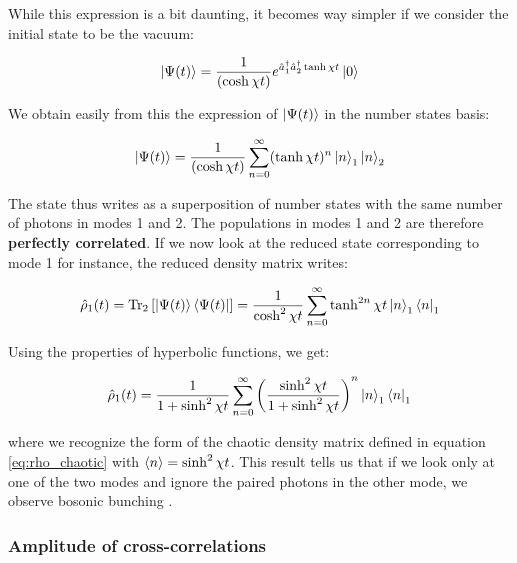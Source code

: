 \noindent While this expression is a bit daunting, it becomes way simpler if we consider the initial state to be the vacuum:

\begin{equation}
    \ket{\Psi(t)} = \frac{1}{(\cosh \chi t)} e^{\hat{a}_{1}^{\dagger} \hat{a}_{2}^{\dagger} \tanh \chi t} \ket{0}
\end{equation}

\noindent We obtain easily from this the expression of $\ket{\Psi(t)}$ in the number states basis:

\begin{equation}
    |\Psi(t)\rangle=\frac{1}{(\cosh \chi t)} \sum_{n=0}^{\infty}(\tanh \chi t)^{n} \ket{n}_1 \ket{n}_2
\end{equation}

\label{sec:correlated_pop}

\noindent The state thus writes as a superposition of number states with the same number of photons in modes 1 and 2. The populations in modes 1 and 2 are therefore \textbf{perfectly correlated}. If we now look at the reduced state corresponding to mode 1 for instance, the reduced density matrix writes:

\begin{equation}
    \hat{\rho}_1 (t) = \mathrm{Tr}_2 \left[ \ket{\Psi(t)} \bra{\Psi(t)} \right] = \frac{1}{\cosh^2 \chi t} \sum_{n=0}^{\infty}\tanh^{2n} \chi t \ket{n}_1 \bra{n}_1
\end{equation}

\noindent Using the properties of hyperbolic functions, we get:

\begin{equation}
 \hat{\rho}_1 (t) = \frac{1}{1+ \sinh^2 \chi t} \sum_{n=0}^{\infty} \left( \frac{\sinh^2 \chi t}{1+\sinh^2 \chi t} \right)^n \ket{n}_1 \bra{n}_1
\end{equation}

\noindent where we recognize the form of the chaotic density matrix defined in equation \ref{eq:rho_chaotic} with $\langle n\rangle = \sinh^2 \chi t$. This result tells us that if we look only at one of the two modes and ignore the paired photons in the other mode, we observe bosonic bunching \cite{yurke1987} .


\subsubsection{Amplitude of cross-correlations}

